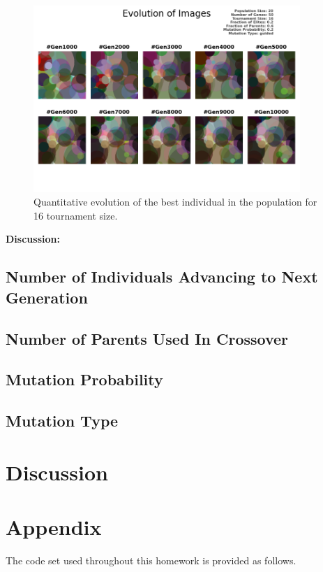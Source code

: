 \documentclass{assignment}
\begin{document}
\begin{figure}[!htb]
    \centering
    \includegraphics[width=0.9\textwidth]{figures/images_output_20_50_16_0.2_0.6_0.2_guided.png}
    \caption{Quantitative evolution of the best individual in the population for 16 tournament size.}
    \label{fig:16tm_image}
\end{figure}

\textbf{Discussion:} 



\subsection{Number of Individuals Advancing to Next Generation}
\subsection{Number of Parents Used In Crossover}
\subsection{Mutation Probability}
\subsection{Mutation Type}

\section{Discussion}

\section*{Appendix}
The code set used throughout this homework is provided as follows. 

% 

% 


\nocite{*} 
\end{document}
